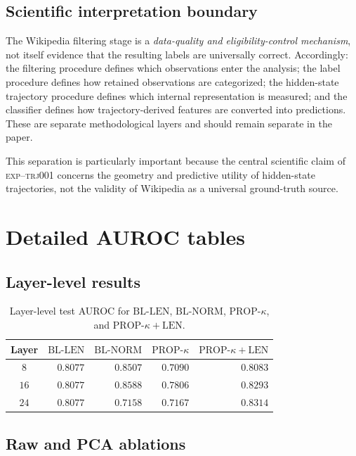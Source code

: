 \documentclass{article}
\newcommand{\propk}{\mathrm{PROP}\text{-}\kappa}
\newcommand{\bllen}{\mathrm{BL\text{-}LEN}}
\newcommand{\blnorm}{\mathrm{BL\text{-}NORM}}
\newcommand{\exptag}{\textsc{exp--trj001}}
\begin{document}
\subsection{Scientific interpretation boundary}
\label{app:b-bound}

The Wikipedia filtering stage is a \emph{data-quality and eligibility-control mechanism}, not itself evidence that the resulting labels are universally correct.
Accordingly:
the filtering procedure defines which observations enter the analysis;
the label procedure defines how retained observations are categorized;
the hidden-state trajectory procedure defines which internal representation is measured;
and the classifier defines how trajectory-derived features are converted into predictions.
These are separate methodological layers and should remain separate in the paper.

This separation is particularly important because the central scientific claim of \exptag{} concerns the geometry and predictive utility of hidden-state trajectories, not the validity of Wikipedia as a universal ground-truth source.

\section{Detailed {AUROC} tables}
\label{app:tables}

\subsection{Layer-level results}
\label{app:c1}

\begin{table}[t]
\centering
\caption{Layer-level test {AUROC} for $\bllen$, $\blnorm$, $\propk$, and $\propk+\mathrm{LEN}$.}
\label{tab:c-layer}
\small
\begin{tabular}{@{}crrrr@{}}
\toprule
Layer & $\bllen$ & $\blnorm$ & $\propk$ & $\propk+\mathrm{LEN}$ \\
\midrule
$8$  & $0.8077$ & $0.8507$ & $0.7090$ & $0.8083$ \\
$16$ & $0.8077$ & $\mathbf{0.8588}$ & $0.7806$ & $0.8293$ \\
$24$ & $0.8077$ & $0.7158$ & $0.7167$ & $0.8314$ \\
\bottomrule
\end{tabular}
\end{table}

\subsection{Raw and {PCA} ablations}
\label{app:c2}
\end{document}
